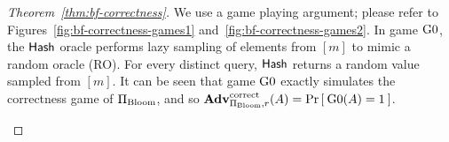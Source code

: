 \begin{proof}[Theorem~\ref{thm:bf-correctness}]
We use a game playing argument; please refer to
Figures~\ref{fig:bf-correctness-games1}
and~\ref{fig:bf-correctness-games2}. In game $\text{G0}$, the
$\mathsf{Hash}$ oracle performs lazy sampling of elements from $[m]$
to mimic a random oracle (RO). For every distinct query,
$\mathsf{Hash}$ returns a random value sampled from $[m]$. It can be
seen that game $\text{G0}$ exactly simulates the correctness game of
$\Pi_{\mathrm{Bloom}}$, and so
$\mathrm{\mathbf{Adv}}^{\mathrm{correct}}_{\Pi_{\mathrm{Bloom}},r}(A) = \Pr\left[\: \text{G0}(A) =
1 \:\right]$.

\begin{figure}[tp]
\end{figure}
\end{proof}
